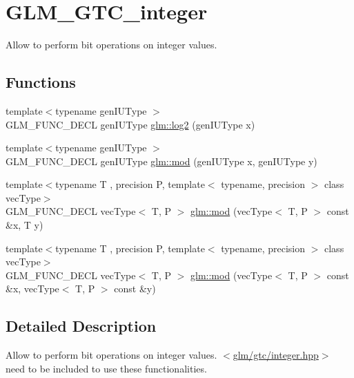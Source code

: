 \hypertarget{group__gtc__integer}{\section{G\-L\-M\-\_\-\-G\-T\-C\-\_\-integer}
\label{group__gtc__integer}
}


Allow to perform bit operations on integer values.  


\subsection*{Functions}
\begin{DoxyCompactItemize}
\item 
{\footnotesize template$<$typename gen\-I\-U\-Type $>$ }\\G\-L\-M\-\_\-\-F\-U\-N\-C\-\_\-\-D\-E\-C\-L gen\-I\-U\-Type \hyperlink{group__gtc__integer_ga9bd682e74bfacb005c735305207ec417}{glm\-::log2} (gen\-I\-U\-Type x)
\item 
{\footnotesize template$<$typename gen\-I\-U\-Type $>$ }\\G\-L\-M\-\_\-\-F\-U\-N\-C\-\_\-\-D\-E\-C\-L gen\-I\-U\-Type \hyperlink{group__gtc__integer_ga75c6fd2a143fc44e5f7b871abad539e0}{glm\-::mod} (gen\-I\-U\-Type x, gen\-I\-U\-Type y)
\item 
{\footnotesize template$<$typename T , precision P, template$<$ typename, precision $>$ class vec\-Type$>$ }\\G\-L\-M\-\_\-\-F\-U\-N\-C\-\_\-\-D\-E\-C\-L vec\-Type$<$ T, P $>$ \hyperlink{group__gtc__integer_ga1d3f62c015315540cebf1f915b67dd9c}{glm\-::mod} (vec\-Type$<$ T, P $>$ const \&x, T y)
\item 
{\footnotesize template$<$typename T , precision P, template$<$ typename, precision $>$ class vec\-Type$>$ }\\G\-L\-M\-\_\-\-F\-U\-N\-C\-\_\-\-D\-E\-C\-L vec\-Type$<$ T, P $>$ \hyperlink{group__gtc__integer_ga689e2d9100af0bfc4d9954c96221095e}{glm\-::mod} (vec\-Type$<$ T, P $>$ const \&x, vec\-Type$<$ T, P $>$ const \&y)
\end{DoxyCompactItemize}


\subsection{Detailed Description}
Allow to perform bit operations on integer values. $<$\hyperlink{gtc_2integer_8hpp}{glm/gtc/integer.\-hpp}$>$ need to be included to use these functionalities. 

